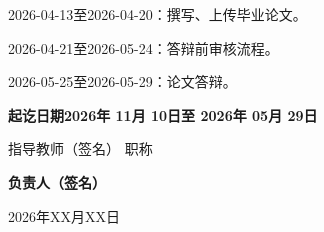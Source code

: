 2026-04-13至2026-04-20：撰写、上传毕业论文。

2026-04-21至2026-05-24：答辩前审核流程。

2026-05-25至2026-05-29：论文答辩。


\vfill
{\bfseries
\noindent 起讫日期\hspace{1em}2026年 11月 10日至 2026年 05月 29日\vspace{0.5ex}\par
\hfill 指导教师（签名）{\underline{\makebox[7.5em][c]{}}}\hspace{0.5em}
职称{\underline{}}\vspace{0.5ex}
}

\par
{}
{\bfseries
\hfill 负责人（签名）{\underline{\makebox[8em][c]{}}}\par
\hfill 2026年XX月XX日
}